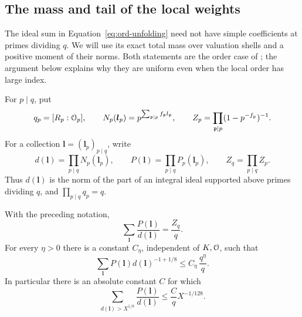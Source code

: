 \subsection{The mass and tail of the local weights}

The ideal sum in Equation~\eqref{eq:ord-unfolding} need not have simple
coefficients at primes dividing \(q\).  We will use its exact total
mass over valuation shells and a positive moment of their norms.
Both statements are the order case of
\cite[Lemma~3.1]{PrimeDegreePackets}; the argument below explains why
they are uniform even when the local order has large index.

For \(p\mid q\), put
\[
 q_p=[R_p:\mathcal O_p],\qquad
 N_p(\boldsymbol l_p)=p^{\sum_{\mathfrak p\mid p}
                                  f_{\mathfrak p}l_{\mathfrak p}},
 \qquad
 Z_p=\prod_{\mathfrak p\mid p}(1-p^{-f_{\mathfrak p}})^{-1}.
\]
For a collection \(\boldsymbol l=(\boldsymbol l_p)_{p\mid q}\), write
\[
 d(\boldsymbol l)=\prod_{p\mid q}N_p(\boldsymbol l_p),\qquad
 P(\boldsymbol l)=\prod_{p\mid q}P_p(\boldsymbol l_p),\qquad
 Z_q=\prod_{p\mid q}Z_p .
\]
Thus \(d(\boldsymbol l)\) is the norm of the part of an integral ideal
supported above primes dividing \(q\), and \(\prod_{p\mid q}q_p=q\).

\begin{lemma}\label{lem:ord-shells}
With the preceding notation,
\begin{equation}\label{eq:ord-shell-mass}
 \sum_{\boldsymbol l}\frac{P(\boldsymbol l)}{d(\boldsymbol l)}
       =\frac{Z_q}{q}.
\end{equation}
For every \(\eta>0\) there is a constant \(C_\eta\), independent of
\(K,\mathcal O\), such that
\begin{equation}\label{eq:ord-shell-moment}
 \sum_{\boldsymbol l}
       P(\boldsymbol l)d(\boldsymbol l)^{-1+1/8}
       \le C_\eta\,\frac{q^\eta}{q}.
\end{equation}
In particular there is an absolute constant \(C\) for which
\begin{equation}\label{eq:ord-shell-tail}
 \sum_{d(\boldsymbol l)>X^{1/8}}
       \frac{P(\boldsymbol l)}{d(\boldsymbol l)}
       \le \frac Cq X^{-1/128}.
\end{equation}
\end{lemma}

